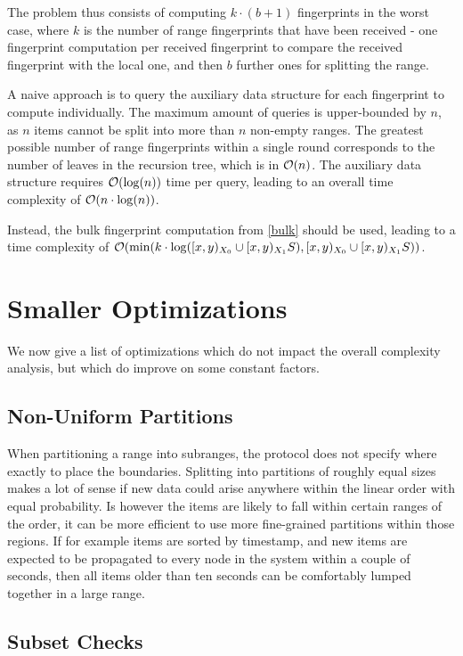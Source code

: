 The problem thus consists of computing $k \cdot (b + 1)$ fingerprints in the worst case, where $k$ is the number of range fingerprints that have been received - one fingerprint computation per received fingerprint to compare the received fingerprint with the local one, and then $b$ further ones for splitting the range.

A naive approach is to query the auxiliary data structure for each fingerprint to compute individually. The maximum amount of queries is upper-bounded by $n$, as $n$ items cannot be split into more than $n$ non-empty ranges. The greatest possible number of range fingerprints within a single round corresponds to the number of leaves in the recursion tree, which is in $\mathcal{O}(n)$. The auxiliary data structure requires $\mathcal{O}(\log(n))$ time per query, leading to an overall time complexity of $\mathcal{O}(n \cdot \log(n))$.

Instead, the bulk fingerprint computation from \cref{bulk} should be used, leading to a time complexity of $\mathcal{O}(\min(k \cdot \log([{x},{y})_{X_0} \cup [{x},{y})_{X_1}{S}), [{x},{y})_{X_0} \cup [{x},{y})_{X_1}{S}))$.

\section{Smaller Optimizations}
\label{set-reconciliation-simple-optimizations}

We now give a list of optimizations which do not impact the overall complexity analysis, but which do improve on some constant factors.

\subsection{Non-Uniform Partitions}

When partitioning a range into subranges, the protocol does not specify where exactly to place the boundaries. Splitting into partitions of roughly equal sizes makes a lot of sense if new data could arise anywhere within the linear order with equal probability. Is however the items are likely to fall within certain ranges of the order, it can be more efficient to use more fine-grained partitions within those regions. If for example items are sorted by timestamp, and new items are expected to be propagated to every node in the system within a couple of seconds, then all items older than ten seconds can be comfortably lumped together in a large range.

\subsection{Subset Checks}
\label{subset-checks}

